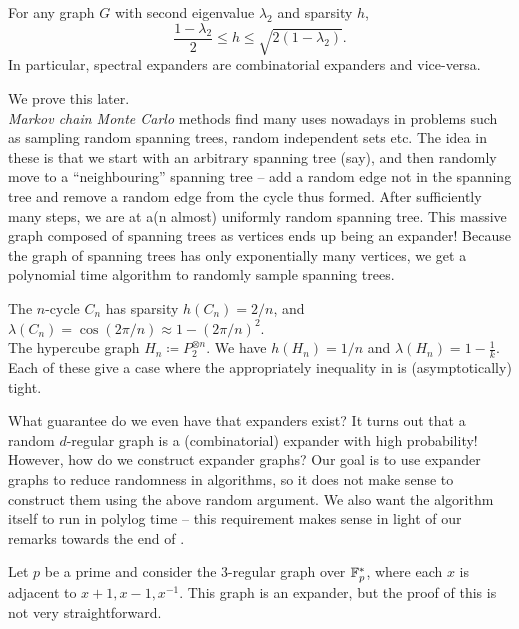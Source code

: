 			\begin{ftheo}
				\label{cheeger inequality}
				For any graph $G$ with second eigenvalue $\lambda_2$ and sparsity $h$,
				\[ \frac{1-\lambda_2}{2} \le h \le \sqrt{2(1-\lambda_2)}. \]
				In particular, spectral expanders are combinatorial expanders and vice-versa.
			\end{ftheo}
			We prove this later.\\

			\emph{Markov chain Monte Carlo} methods find many uses nowadays in problems such as sampling random spanning trees, random independent sets etc. The idea in these is that we start with an arbitrary spanning tree (say), and then randomly move to a ``neighbouring'' spanning tree -- add a random edge not in the spanning tree and remove a random edge from the cycle thus formed. After sufficiently many steps, we are at a(n almost) uniformly random spanning tree. This massive graph composed of spanning trees as vertices ends up being an expander! Because the graph of spanning trees has only exponentially many vertices, we get a polynomial time algorithm to randomly sample spanning trees.

			\begin{fex}
				The $n$-cycle $C_n$ has sparsity $h(C_n) = 2/n$, and $\lambda(C_n) = \cos(2\pi/n) \approx 1 - (2\pi/n)^2$.\\
				The hypercube graph $H_n \coloneqq P_2^{\otimes n}$. We have $h(H_n) = 1/n$ and $\lambda(H_n) = 1 - \frac{1}{k}$.\\
				Each of these give a case where the appropriately inequality in  is (asymptotically) tight.
			\end{fex}

			What guarantee do we even have that expanders exist? It turns out that a random $d$-regular graph is a (combinatorial) expander with high probability!\\
			
			However, how do we construct expander graphs? Our goal is to use expander graphs to reduce randomness in algorithms, so it does not make sense to construct them using the above random argument. We also want the algorithm itself to run in polylog time -- this requirement makes sense in light of our remarks towards the end of \nameref{lec 6}.

			\begin{fex}
				Let $p$ be a prime and consider the $3$-regular graph over $\mathbb{F}_p^*$, where each $x$ is adjacent to $x+1,x-1,x^{-1}$. This graph is an expander, but the proof of this is not very straightforward.
			\end{fex}

